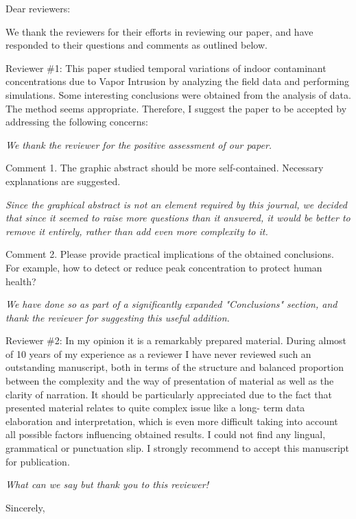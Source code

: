 \documentclass{letter}
\begin{document}
\begin{letter}{ }
\opening{Dear reviewers:}

We thank the reviewers for their efforts in reviewing our paper, and have
responded to their questions and comments as outlined below.

Reviewer \#1: This paper studied temporal variations of indoor contaminant concentrations
due to Vapor Intrusion by analyzing the field data and performing simulations. Some
interesting conclusions were obtained from the analysis of data. The method seems
appropriate. Therefore, I suggest the paper to be accepted by addressing the following
concerns:

\textit{We thank the reviewer for the positive assessment of our paper.}

Comment 1. The graphic abstract should be more self-contained. Necessary explanations
are suggested. 

\textit{Since the graphical abstract is not an element required by this journal, we decided that since
it seemed to raise more questions than it answered, it would be better to remove it entirely,
rather than add even more complexity to it.}

Comment 2. Please provide practical implications of the obtained conclusions. For example, how to
detect or reduce peak concentration to protect human health?

\textit{We have done so as part of a significantly expanded "Conclusions" section, and thank the
reviewer for suggesting this useful addition.}

Reviewer \#2: In my opinion it is a remarkably prepared material. During almost of 10 years of
my experience as a reviewer I have never reviewed such an outstanding manuscript, both in
terms of the structure and balanced proportion between the complexity and the way of
presentation of material as well as the clarity of narration. It should be particularly
appreciated due to the fact that presented material relates to quite complex issue like a long-
term data elaboration and interpretation, which is even more difficult taking into account all
possible factors influencing obtained results.
I could not find any lingual, grammatical or punctuation slip. I strongly recommend to accept
this manuscript for publication.

\textit{What can we say but thank you to this reviewer!}

\closing{Sincerely,}

\end{letter}
\end{document}
